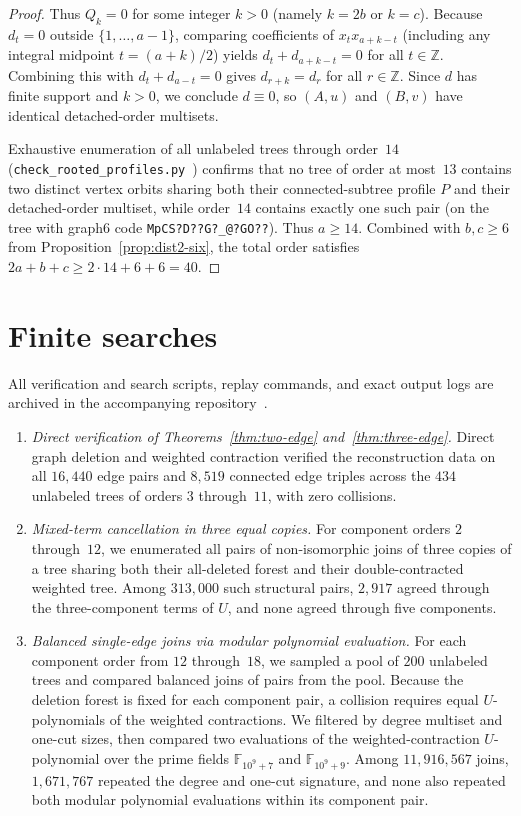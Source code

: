 \documentclass[10pt]{article}
\begin{document}
\begin{proof}
Thus $Q_k=0$ for some integer $k>0$ (namely $k=2b$ or $k=c$). Because $d_t=0$ outside $\{1,\ldots,a-1\}$, comparing coefficients of $x_t x_{a+k-t}$ (including any integral midpoint $t=(a+k)/2$) yields $d_t+d_{a+k-t}=0$ for all $t\in\mathbb{Z}$. Combining this with $d_t+d_{a-t}=0$ gives $d_{r+k}=d_r$ for all $r\in\mathbb{Z}$. Since $d$ has finite support and $k>0$, we conclude $d\equiv 0$, so $(A,u)$ and $(B,v)$ have identical detached-order multisets.

Exhaustive enumeration of all unlabeled trees through order~$14$ (\texttt{check\_rooted\_profiles.py}~\cite{repo}) confirms that no tree of order at most~$13$ contains two distinct vertex orbits sharing both their connected-subtree profile $P$ and their detached-order multiset, while order~$14$ contains exactly one such pair (on the tree with graph6 code \texttt{MpCS?D??G?\_@?GO??}). Thus $a\ge 14$. Combined with $b,c\ge 6$ from Proposition~\ref{prop:dist2-six}, the total order satisfies $2a+b+c \ge 2\cdot 14 + 6 + 6 = 40$.
\end{proof}

\section{Finite searches}

All verification and search scripts, replay commands, and exact output logs are archived in the accompanying repository~\cite{repo}.

\begin{enumerate}
\item \emph{Direct verification of Theorems~\ref{thm:two-edge} and~\ref{thm:three-edge}.} Direct graph deletion and weighted contraction verified the reconstruction data on all $16{,}440$ edge pairs and $8{,}519$ connected edge triples across the $434$ unlabeled trees of orders $3$ through~$11$, with zero collisions.

\item \emph{Mixed-term cancellation in three equal copies.} For component orders $2$ through~$12$, we enumerated all pairs of non-isomorphic joins of three copies of a tree sharing both their all-deleted forest and their double-contracted weighted tree. Among $313{,}000$ such structural pairs, $2{,}917$ agreed through the three-component terms of $U$, and none agreed through five components.

\item \emph{Balanced single-edge joins via modular polynomial evaluation.} For each component order from $12$ through~$18$, we sampled a pool of $200$ unlabeled trees and compared balanced joins of pairs from the pool. Because the deletion forest is fixed for each component pair, a collision requires equal $U$-polynomials of the weighted contractions. We filtered by degree multiset and one-cut sizes, then compared two evaluations of the weighted-contraction $U$-polynomial over the prime fields $\mathbb{F}_{10^9+7}$ and $\mathbb{F}_{10^9+9}$. Among $11{,}916{,}567$ joins, $1{,}671{,}767$ repeated the degree and one-cut signature, and none also repeated both modular polynomial evaluations within its component pair.
\end{enumerate}
\end{document}
